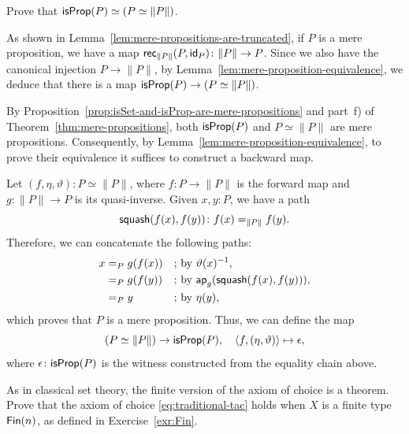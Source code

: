 \begin{exr}\fe
    Prove that\/ $\mathsf{isProp}(P)\simeq(P\simeq\lVert P\rVert)$.
\end{exr}

\begin{solution}
    As shown in Lemma~\ref{lem:mere-propositions-are-truncated}, if $P$ is a mere proposition, we have a map $\fun{rec}_{\lVert P\rVert}(P,\id_P)\colon\lVert P\rVert\to P$. Since we also have the canonical injection $P\to\lVert P\rVert$, by Lemma~\ref{lem:mere-proposition-equivalence}, we deduce that there is a map $\mathsf{isProp}(P)\to(P\simeq\lVert P\rVert)$.

    By Proposition~\ref{prop:isSet-and-isProp-are-mere-propositions} and part~f) of Theorem~\ref{thm:mere-propositions}, both $\mathsf{isProp}(P)$ and $P\simeq\lVert P\rVert$ are mere propositions. Consequently, by Lemma~\ref{lem:mere-proposition-equivalence}, to prove their equivalence it suffices to construct a backward map.

    Let $(f,\eta,\vartheta)\colon P\simeq\lVert P\rVert$, where $f\colon P \to \lVert P \rVert$ is the forward map and $g\colon \lVert P \rVert \to P$ is its quasi-inverse. Given $x,y\colon P$, we have a path
    \[
        \fun{squash}(f(x),f(y))\colon f(x)\eq{\lVert P\rVert}f(y).
    \]
    Therefore, we can concatenate the following paths:
    \begin{align*}
        x
            &\mathrel{=_{P}} g(f(x))
                &&\text{; by } \vartheta(x)^{-1},\\
            &\mathrel{=_{P}} g(f(y))
                &&\text{; by } \mathsf{ap}_g(\mathsf{squash}(f(x),f(y))),\\
            &\mathrel{=_{P}} y
                &&\text{; by } \eta(y),
    \end{align*}
    which proves that $P$ is a mere proposition. Thus, we can define the map
    \[
        (P\simeq\lVert P\rVert)\to\mathsf{isProp}(P),
            \quad\langle f,(\eta,\vartheta)\rangle\mapsto\epsilon,
    \]
    where $\epsilon\colon \fun{isProp}(P)$ is the witness constructed from the equality chain above.    
\end{solution}

\begin{exr}\fe\label{exr:finite-axiom-of-choice}
    As in classical set theory, the finite version of the axiom of choice is a theorem. Prove that the axiom of choice \eqref{eq:traditional-tac} holds when\/ $X$ is a finite type\/ $\mathsf{Fin}(n)$, as defined in\/ {\upshape Exercise~\ref{exr:Fin}}.
\end{exr}

